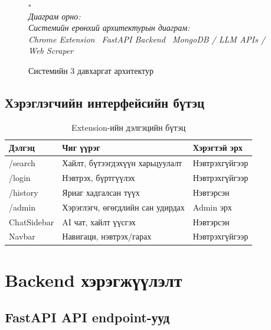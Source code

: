 \documentclass[12pt,a4paper]{report}
\newcommand{\figplaceholder}[2][7cm]{%
  \vspace{8pt}
  \begin{center}
    \colorbox{placeholderbg}{%
      \parbox[c][#1][c]{0.85\textwidth}{\centering
        {\color{darkgray!60}\Large $\square$}\\[8pt]
        {\color{darkgray}\itshape\small Диаграм орно:\\[4pt] #2}}}
  \end{center}
  \vspace{8pt}}
\begin{document}
\begin{figure}[H]
  \centering
  \figplaceholder[10cm]{Системийн ерөнхий архитектурын диаграм:\\ Chrome Extension \textrightarrow\ FastAPI Backend \textrightarrow\ MongoDB / LLM APIs / Web Scraper}
  \caption{Системийн 3 давхаргат архитектур}
  \label{fig:arch}
\end{figure}

\subsection{Хэрэглэгчийн интерфейсийн бүтэц}

\begin{table}[H]
\centering
\caption{Extension-ийн дэлгэцийн бүтэц}
\label{tab:ui_structure}
\begin{tabularx}{\textwidth}{@{}lXl@{}}
\toprule
\textbf{Дэлгэц} & \textbf{Чиг үүрэг} & \textbf{Хэрэгтэй эрх} \\
\midrule
/search & Хайлт, бүтээгдэхүүн харьцуулалт & Нэвтрэхгүйгээр \\
/login  & Нэвтрэх, бүртгүүлэх & Нэвтрэхгүйгээр \\
/history & Яриаг хадгалсан түүх & Нэвтэрсэн \\
/admin  & Хэрэглэгч, өгөгдлийн сан удирдах & Admin эрх \\
ChatSidebar & AI чат, хайлт үүсгэх & Нэвтэрсэн \\
Navbar & Навигаци, нэвтрэх/гарах & Нэвтрэхгүйгээр \\
\bottomrule
\end{tabularx}
\end{table}

\section{Backend хэрэгжүүлэлт}

\subsection{FastAPI API endpoint-ууд}
\end{document}
